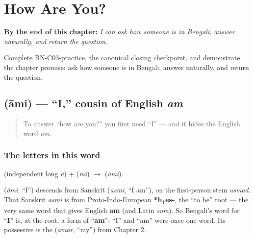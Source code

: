 
\chapter{How Are You?}
\label{ch:responding}

\begin{chapteropening}
\textbf{By the end of this chapter:} \emph{I can ask how someone is in Bengali, answer naturally, and return the question.}

Complete BN-C03-practice, the canonical closing checkpoint, and demonstrate the chapter promise: ask how someone is in Bengali, answer naturally, and return the question.
\end{chapteropening}

\section[\bn{আমি}]{ (āmi) — \textquotedblleft{}I,\textquotedblright{} cousin of English \emph{am}}

\label{lesson:BN-C03-ami}



\begin{quote}
To answer \textquotedblleft{}how are you?\textquotedblright{} you first need \textquotedblleft{}I\textquotedblright{} — and it hides the English word \emph{am}.
\end{quote}

\subsection*{The letters in this word}
\textbf{} (independent long \emph{ā}) + \textbf{} (\emph{mi}) $\to$ \textbf{} (\emph{āmi}).

\begin{cousinweb}
\textbf{} (\emph{āmi}, \textquotedblleft{}I\textquotedblright{}) descends from Sanskrit \textbf{} (\emph{asmi}, \textquotedblleft{}I am\textquotedblright{}), on the first-person stem \emph{asmad}. That Sanskrit \emph{asmi} is from Proto-Indo-European \textbf{*h\textsubscript{1}es-}, the \textquotedblleft{}to be\textquotedblright{} root — the very same word that gives English \textbf{am} (and Latin \emph{sum}). So Bengali's word for \textquotedblleft{}\textbf{I}\textquotedblright{} is, at the root, a form of \textquotedblleft{}\textbf{am}\textquotedblright{}: \textquotedblleft{}I\textquotedblright{} and \textquotedblleft{}am\textquotedblright{} were once one word. Its possessive is the \textbf{} (\emph{āmār}, \textquotedblleft{}my\textquotedblright{}) from Chapter 2.
\end{cousinweb}

